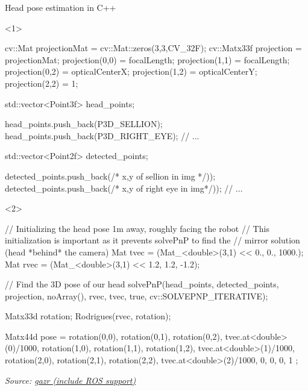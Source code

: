 \documentclass[compress]{beamer}
\newcommand{\source}[2]{{\tiny\it Source: \href{#1}{#2}}}
\begin{document}
\begin{frame}[fragile]{Head pose estimation in C++}

\begin{onlyenv}<1>
\begin{cppcode}

    cv::Mat projectionMat = cv::Mat::zeros(3,3,CV_32F);
    cv::Matx33f projection = projectionMat;
    projection(0,0) = focalLength;
    projection(1,1) = focalLength;
    projection(0,2) = opticalCenterX;
    projection(1,2) = opticalCenterY;
    projection(2,2) = 1;

    std::vector<Point3f> head_points;

    head_points.push_back(P3D_SELLION);
    head_points.push_back(P3D_RIGHT_EYE);
    // ...

    std::vector<Point2f> detected_points;

    detected_points.push_back(/* x,y of sellion in img */));
    detected_points.push_back(/* x,y of right eye in img*/));
    // ...

\end{cppcode}
\end{onlyenv}
\begin{onlyenv}<2>
\begin{cppcode}
    // Initializing the head pose 1m away, roughly facing the robot
    // This initialization is important as it prevents solvePnP to find the
    // mirror solution (head *behind* the camera)
    Mat tvec = (Mat_<double>(3,1) << 0., 0., 1000.);
    Mat rvec = (Mat_<double>(3,1) << 1.2, 1.2, -1.2);

    // Find the 3D pose of our head
    solvePnP(head_points, detected_points,
            projection, noArray(),
            rvec, tvec, true,
            cv::SOLVEPNP_ITERATIVE);

    Matx33d rotation;
    Rodrigues(rvec, rotation);

    Matx44d pose = {
     rotation(0,0), rotation(0,1), rotation(0,2), tvec.at<double>(0)/1000,
     rotation(1,0), rotation(1,1), rotation(1,2), tvec.at<double>(1)/1000,
     rotation(2,0), rotation(2,1), rotation(2,2), tvec.at<double>(2)/1000,
                 0,             0,             0,                       1
    };

\end{cppcode}
\end{onlyenv}

    \source{http://github.com/severin-lemaignan/gazr}{gazr (include ROS support)}
\end{frame}
\end{document}
